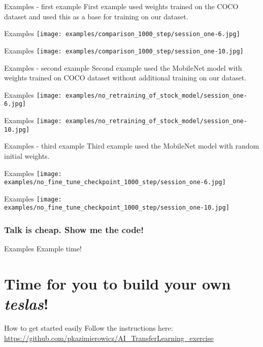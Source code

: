 \documentclass[aspectratio=1610,english]{beamer} %
\begin{document}
  	\begin{frame}{Examples - first example}
		First example used weights trained on the COCO dataset and used this as a base for training on our dataset.
	\end{frame}
  	\begin{frame}{Examples}
		\texttt{[image: examples/comparison\_1000\_step/session\_one-6.jpg]}
	\end{frame}
  	\begin{frame}{Examples}
		\texttt{[image: examples/comparison\_1000\_step/session\_one-10.jpg]}
	\end{frame}
	
  	\begin{frame}{Examples - second example}
		Second example used the MobileNet model with weights trained on COCO dataset without additional training on our dataset.
	\end{frame}
  	\begin{frame}{Examples}
		\texttt{[image: examples/no\_retraining\_of\_stock\_model/session\_one-6.jpg]}
	\end{frame}
  	\begin{frame}{Examples}
		\texttt{[image: examples/no\_retraining\_of\_stock\_model/session\_one-10.jpg]}
	\end{frame}
	
	
  	\begin{frame}{Examples - third example}
		Third example used the MobileNet model with random initial weights.
	\end{frame}
  	\begin{frame}{Examples}
		\texttt{[image: examples/no\_fine\_tune\_checkpoint\_1000\_step/session\_one-6.jpg]}
	\end{frame}
  	\begin{frame}{Examples}
		\texttt{[image: examples/no\_fine\_tune\_checkpoint\_1000\_step/session\_one-10.jpg]}
	\end{frame}
	
  	
  	\section{Talk is cheap. Show me the code!}
	\begin{frame}{Examples}
	Example time!
	\end{frame}
	
	
\part{Time for you to build your own \textit{teslas}!}
	\begin{frame}{How to get started easily}
	Follow the instructions here:
	\url{https://github.com/pkazimierowicz/AI_TransferLearning_exercise}
	\end{frame}
\end{document}
